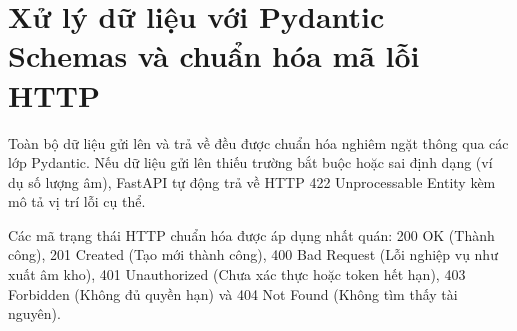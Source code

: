 \section{Xử lý dữ liệu với Pydantic Schemas và chuẩn hóa mã lỗi HTTP}

Toàn bộ dữ liệu gửi lên và trả về đều được chuẩn hóa nghiêm ngặt thông qua các lớp Pydantic. Nếu dữ liệu gửi lên thiếu trường bắt buộc hoặc sai định dạng (ví dụ số lượng âm), FastAPI tự động trả về HTTP 422 Unprocessable Entity kèm mô tả vị trí lỗi cụ thể.

Các mã trạng thái HTTP chuẩn hóa được áp dụng nhất quán: 200 OK (Thành công), 201 Created (Tạo mới thành công), 400 Bad Request (Lỗi nghiệp vụ như xuất âm kho), 401 Unauthorized (Chưa xác thực hoặc token hết hạn), 403 Forbidden (Không đủ quyền hạn) và 404 Not Found (Không tìm thấy tài nguyên).

